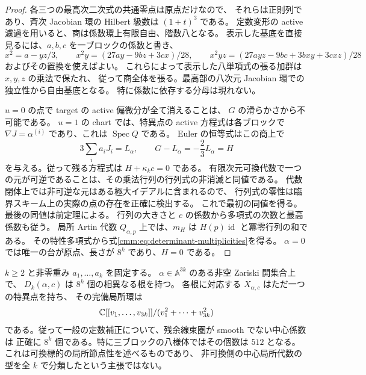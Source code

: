 \begin{proof}
各三つの最高次二次式の共通零点は原点だけなので、
それらは正則列であり、斉次 Jacobian 環の Hilbert 級数は $(1+t)^3$ である。
定数変形の active 濾過を用いると、商は係数環上有限自由、階数八となる。
表示した基底を直接見るには、$a,b,c$ を一ブロックの係数と書き、
\[
 x^2=a-yz/3,\qquad
 x^2y=(27ay-9bz+3cx)/28,\qquad
 x^2yz=(27ayz-9bc+3bxy+3cxz)/28
\]
およびその置換を使えばよい。
これらによって表示した八単項式の張る加群は $x,y,z$ の乗法で保たれ、
従って商全体を張る。最高部の八次元 Jacobian 環での独立性から自由基底となる。
特に係数に依存する分母は現れない。

$u=0$ の点で target の active 偏微分が全て消えることは、
$G$ の滑らかさから不可能である。
$u=1$ の chart では、特異点の active 方程式は各ブロックで
$\nabla J=\alpha^{(i)}$ であり、これは $\operatorname{Spec}Q$ である。
Euler の恒等式はこの商上で
\[
 3\sum_i a_iJ_i=L_\alpha,\qquad
 G-L_\alpha=-\frac23L_\alpha=H
\]
を与える。従って残る方程式は $H+\kappa_kc=0$ である。
有限次元可換代数で一つの元が可逆であることは、その乗法行列の行列式の非消滅と同値である。
代数閉体上では非可逆な元はある極大イデアルに含まれるので、
行列式の零性は臨界スキーム上の実際の点の存在を正確に検出する。
これで最初の同値を得る。最後の同値は前定理による。
行列の大きさと $c$ の係数から多項式の次数と最高係数も従う。
局所 Artin 代数 $Q_{\alpha,p}$ 上では、$m_H$ は
$H(p)\operatorname{id}$ と冪零行列の和である。
その特性多項式から式\eqref{cmm:eq:determinant-multiplicities}を得る。
$\alpha=0$ では唯一の台が原点、長さが $8^k$ であり、$H=0$ である。
\end{proof}

\begin{corollary}
\label{cmm:cor:generic-nodal-discriminant}
$k\ge2$ と非零重み $a_1,\ldots,a_k$ を固定する。
$\alpha\in\mathbb A^{3k}$ のある非空 Zariski 開集合上で、
$D_k(\alpha,c)$ は $8^k$ 個の相異なる根を持つ。
各根に対応する $X_{\alpha,c}$ はただ一つの特異点を持ち、
その完備局所環は
\[
 \mathbb C[[v_1,\ldots,v_{3k}]]/(v_1^2+\cdots+v_{3k}^2)
\]
である。従って一般の定数補正について、残余線束圏が smooth でない中心係数は
正確に $8^k$ 個である。特に三ブロックの八様体ではその個数は $512$ となる。
これは可換標的の局所節点性を述べるものであり、
非可換側の中心局所代数の型を全 $k$ で分類したという主張ではない。
\end{corollary}

